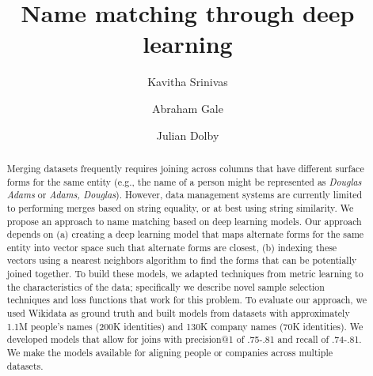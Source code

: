 \documentclass[runningheads]{llncs}
\begin{document}
%
\title{Name matching through deep learning}
%
%
\author{Kavitha Srinivas \and
Abraham Gale \and
Julian Dolby}
%
%

%
\maketitle              %
%
\begin{abstract}
Merging datasets frequently requires joining across columns that have
different surface forms for the same entity (e.g., the name of a
person might be represented as \textit{Douglas Adams} or
\textit{Adams, Douglas}).  However, data management systems are currently limited
to performing merges based on string equality, or at best using
string similarity.  We propose an approach to name matching based on deep learning models.  
Our approach depends on (a) creating
a deep learning model that maps alternate forms for the same entity into vector space such that alternate forms are closest, (b) indexing these vectors using a nearest
neighbors algorithm to find the forms that can be potentially joined
together.  To build these models, we adapted techniques from
metric learning to the characteristics of the data; specifically we describe 
novel sample selection techniques and loss functions that work for this problem.  
To evaluate our approach, we used Wikidata as ground truth
and built models from datasets with approximately 1.1M people's names
(200K identities) and 130K company names (70K identities).  We developed models that 
allow for joins with precision@1 of .75-.81 and
recall of .74-.81.  We make the models available for aligning people or companies across multiple datasets.  

\end{abstract}
%
%
%








%
%
%


 
\end{document}
